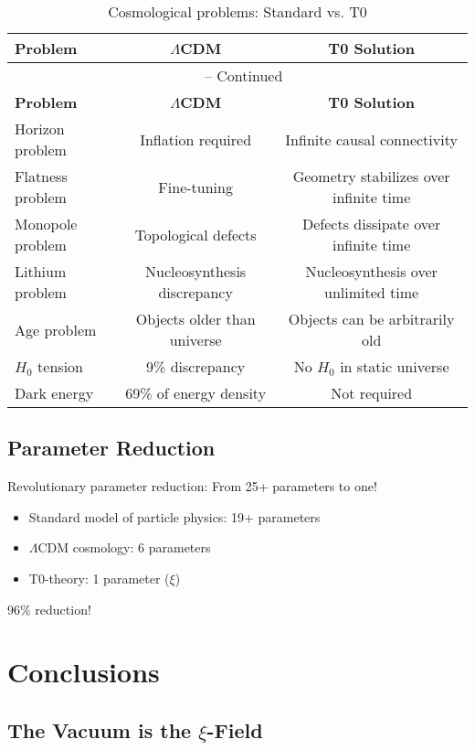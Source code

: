 \documentclass[12pt,a4paper]{article}
\begin{document}
	\begin{longtable}{lcc}
		\caption{Cosmological problems: Standard vs. T0} \\
		\toprule
		\textbf{Problem} & \textbf{$\Lambda$CDM} & \textbf{T0 Solution} \\
		\midrule
		\endfirsthead
		\multicolumn{3}{c}{\tablename\ \thetable{} -- Continued} \\
		\toprule
		\textbf{Problem} & \textbf{$\Lambda$CDM} & \textbf{T0 Solution} \\
		\midrule
		\endhead
		Horizon problem & Inflation required & Infinite causal connectivity \\
		Flatness problem & Fine-tuning & Geometry stabilizes over infinite time \\
		Monopole problem & Topological defects & Defects dissipate over infinite time \\
		Lithium problem & Nucleosynthesis discrepancy & Nucleosynthesis over unlimited time \\
		Age problem & Objects older than universe & Objects can be arbitrarily old \\
		$H_0$ tension & 9\% discrepancy & No $H_0$ in static universe \\
		Dark energy & 69\% of energy density & Not required \\
		\bottomrule
	\end{longtable}
	
	\subsection{Parameter Reduction}
	
	\begin{revolutionary}
		Revolutionary parameter reduction: From 25+ parameters to one!
		\begin{itemize}
			\item Standard model of particle physics: 19+ parameters
			\item $\Lambda$CDM cosmology: 6 parameters
			\item T0-theory: 1 parameter ($\xi$)
		\end{itemize}
		96\% reduction!
	\end{revolutionary}
	
	\section{Conclusions}
	

	\subsection{The Vacuum is the $\xi$-Field}
	
\end{document}
